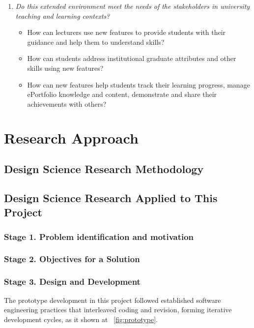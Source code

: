 \begin{enumerate}
	\item \textit{Do this extended environment meet the needs of the stakeholders
in university teaching and learning contexts?}
	\begin{itemize}
		\item How can lecturers use new features to provide students with their
guidance and help them to understand \LLLs skills?
		\item How can students address institutional graduate attributes and other
		skills using new features?
		\item How can new features help students track their learning progress, manage
ePortfolio knowledge and content, demonstrate and share their achievements
with others?
	\end{itemize}
\end{enumerate}

\section{Research Approach}

\subsection{Design Science Research Methodology}

\subsection{Design Science Research Applied to This Project}

\subsubsection{Stage 1. Problem identification and motivation}

\subsubsection{Stage 2. Objectives for a Solution}

\subsubsection{Stage 3. Design and Development}

The prototype development in this project followed established
software engineering practices that interleaved coding and revision, forming
iterative development cycles, as it shown at ~\ref{fig:prototype}.

